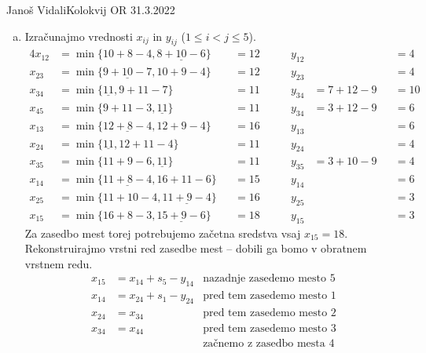 \begin{naloga}{Janoš Vidali}{Kolokvij OR 31.3.2022}
\begin{odgovor}
\begin{enumerate}[(a)]
\item Izračunajmo vrednosti $x_{ij}$ in $y_{ij}$ ($1 \le i < j \le 5$).
\begin{alignat*}{4}
x_{12} &= \min\{10+8-4, \underline{8+10-6}\} &&= 12 &\qquad y_{12} &&&= 4 \\
x_{23} &= \min\{\underline{9+10-7}, 10+9-4\} &&= 12 &\qquad y_{23} &&&= 4 \\
x_{34} &= \min\{\underline{11}, 9+11-7\} &&= 11 &\qquad y_{34} &= 7+12-9 &&= 10 \\
x_{45} &= \min\{9+11-3, \underline{11}\} &&= 11 &\qquad y_{34} &= 3+12-9 &&= 6 \\
x_{13} &= \min\{\underline{12+8-4}, 12+9-4\} &&= 16 &\qquad y_{13} &&&= 6 \\
x_{24} &= \min\{\underline{11}, 12+11-4\} &&= 11 &\qquad y_{24} &&&= 4 \\
x_{35} &= \min\{11+9-6, \underline{11}\} &&= 11 &\qquad y_{35} &= 3+10-9 &&= 4 \\
x_{14} &= \min\{\underline{11+8-4}, 16+11-6\} &&= 15 &\qquad y_{14} &&&= 6 \\
x_{25} &= \min\{11+10-4, \underline{11+9-4}\} &&= 16 &\qquad y_{25} &&&= 3 \\
x_{15} &= \min\{16+8-3, \underline{15+9-6}\} &&= 18 &\qquad y_{15} &&&= 3
\end{alignat*}
Za zasedbo mest torej potrebujemo začetna sredstva vsaj $x_{15} = 18$.
Rekonstruirajmo vrstni red zasedbe mest
-- dobili ga bomo v obratnem vrstnem redu.
\begin{align*}
x_{15} &= x_{14} + s_5 - y_{14} & \text{nazadnje zasedemo mesto $5$} \\
x_{14} &= x_{24} + s_1 - y_{24} & \text{pred tem zasedemo mesto $1$} \\
x_{24} &= x_{34}                & \text{pred tem zasedemo mesto $2$} \\
x_{34} &= x_{44}                & \text{pred tem zasedemo mesto $3$} \\
       &                        & \text{začnemo z zasedbo mesta $4$}
\end{align*}
\end{enumerate}
\end{odgovor}
\end{naloga}
